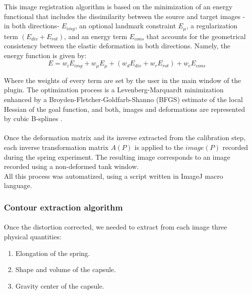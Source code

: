 This image registration algorithm is based on the minimization of an energy functional that includes the dissimilarity between the source and target images -in both directions- $E_{img}$, an optional landmark constraint $E_{\mu}$, a regularization term $(E_{div} + E_{rot})$, and an energy term $E_{cons}$ that accounts for the geometrical consistency between the elastic deformation in both directions. Namely, the energy function is given by:
\begin{equation*}
		E = w_iE_{img} + w_{\mu}E_{\mu} + (w_dE_{div} + w_rE_{rot}) + w_cE_{cons} 
\end{equation*}
                  

Where the weights of every term are set by the user in the main window of the plugin. The optimization process is a Levenberg-Marquardt minimization enhanced by a Broyden-Fletcher-Goldfarb-Shanno (BFGS) estimate of the local Hessian of the goal function, and both, images and deformations are represented by cubic B-splines \cite{bunwrapJ,unwrapJ}. 

\paragraph{}
Once the deformation matrix and its inverse extracted from the calibration step, each inverse transformation matrix $A(P)$ is applied to the $image(P)$ recorded during the spring experiment. The resulting image corresponds to an image recorded using a non-deformed tank window.\\
All this process was automatized, using a script written in ImageJ macro language.
\subsubsection{Contour extraction algorithm}
\paragraph{}
Once the distortion corrected, we needed to extract from each image three physical quantities:
\begin{enumerate}
	\item Elongation of the spring.
	\item Shape and volume of the capsule.
	\item Gravity center of the capsule.
\end{enumerate}
